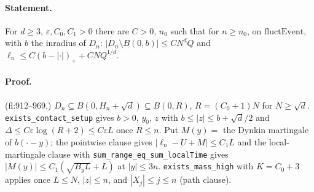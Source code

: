 \paragraph{Statement.} For $d\geq3$, $\varepsilon,C_0,C_1>0$ there are $C>0$, $n_0$ such that for $n\geq n_0$, on $\mathrm{fluctEvent}$, with $b$ the inradius of $D_n$:
$|D_n\setminus B(0,b)|\leq CN^dQ$ and $\ell_n\leq C(b-|\cdot|)_++CNQ^{1/d}$.
\paragraph{Proof.} (fl:912--969.) $D_n\subseteq B(0,H_n+\sqrt d)\subseteq B(0,R)$, $R=(C_0+1)N$ for $N\geq\sqrt d$. \texttt{exists\_contact\_setup} gives $b>0$, $y_0$, $z$ with $b\leq|z|\leq b+\sqrt d/2$
and $\Delta\leq C\varepsilon\log(R+2)\leq C\varepsilon L$ once $R\leq n$. Put $M(y)=$ the Dynkin martingale of $b(\cdot-y)$; the pointwise clause gives $|\ell_n-U+M|\leq C_1L$ and
the local-martingale clause with \texttt{sum\_range\_eq\_sum\_localTime} gives $|M(y)|\leq C_1(\sqrt{B_yL}+L)$ at $|y|\leq3n$. \texttt{exists\_mass\_high} with $K=C_0+3$
applies once $L\leq N$, $|z|\leq n$, and $|X_j|\leq j\leq n$ (path clause).
